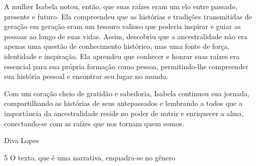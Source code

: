 \begin{itemize}
\begin{itemize}
{\begin{itemize}
\begin{itemize}
\begin{escolha}
\begin{escolha}
\begin{escolha}
\begin{escolha}
\begin{escolha}
\begin{escolha}
\begin{escolha}
\begin{escolha}
\begin{escolha}
\begin{escolha}
\begin{escolha}
\begin{escolha}
A mulher Isabela notou, então, que suas raízes eram um elo entre
passado, presente e futuro. Ela compreendeu que as histórias e tradições
transmitidas de geração em geração eram um tesouro valioso que poderia
inspirar e guiar as pessoas ao longo de suas vidas. Assim, descobriu que
a ancestralidade não era apenas uma questão de conhecimento histórico,
mas uma fonte de força, identidade e inspiração. Ela aprendeu que
conhecer e honrar suas raízes era essencial para sua própria formação
como pessoa, permitindo-lhe compreender sua história pessoal e encontrar
seu lugar no mundo.

Com um coração cheio de gratidão e sabedoria, Isabela continuou sua
jornada, compartilhando as histórias de seus antepassados e lembrando a
todos que a importância da ancestralidade reside no poder de nutrir e
enriquecer a alma, conectando-se com as raízes que nos tornam quem
somos.

Diva Lopes

\num{5} O texto, que é uma narrativa, enquadra-se no gênero

\end{escolha}
\end{escolha}
\end{escolha}
\end{escolha}
\end{escolha}
\end{escolha}
\end{escolha}
\end{escolha}
\end{escolha}
\end{escolha}
\end{escolha}
\end{escolha}
\end{itemize}
\end{itemize}}
\end{itemize}
\end{itemize}
